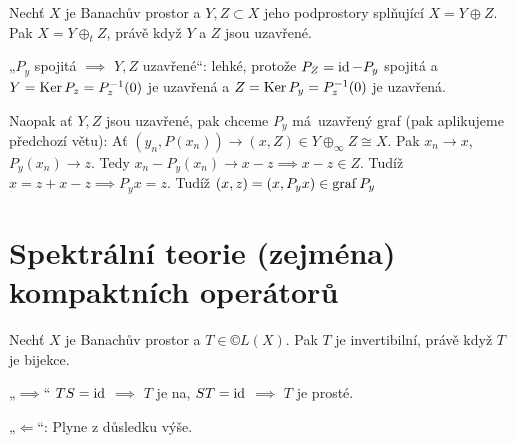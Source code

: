 \documentclass[12pt]{article}					%
\begin{document}
\begin{veta}
	Nechť $X$ je Banachův prostor a $Y, Z \subset X$ jeho podprostory splňující $X = Y \oplus Z$. Pak $X = Y\oplus_t Z$, právě když $Y$ a $Z$ jsou uzavřené.

	\begin{dukazin}
		„$P_y$ spojitá $\implies$ $Y, Z$ uzavřené“: lehké, protože $P_Z = \operatorname{id} - P_y$ spojitá a $Y = \operatorname{Ker} P_z = P_z^{-1}(0)$ je uzavřená a $Z = \operatorname{Ker} P_y = P_z^{-1}(0)$ je uzavřená.

		Naopak ať $Y, Z$ jsou uzavřené, pak chceme $P_y$ má uzavřený graf (pak aplikujeme předchozí větu): Ať $(y_n, P(x_n)) \rightarrow (x, Z) \in Y \oplus_∞ Z \cong X$. Pak $x_n \rightarrow x$, $P_y(x_n) \rightarrow z$. Tedy $x_n - P_y(x_n) \rightarrow x - z \implies x - z \in Z$. Tudíž $x = z + x - z \implies P_y x = z$. Tudíž $(x, z) = (x, P_yx) \in \operatorname{graf} P_y$
	\end{dukazin}
\end{veta}

\section{Spektrální teorie (zejména) kompaktních operátorů}
\begin{tvrzeni}
	Nechť $X$ je Banachův prostor a $T \in ©L(X)$. Pak $T$ je invertibilní, právě když $T$ je bijekce.

	\begin{dukazin}
		„$\implies$“ $TS = \operatorname{id}$ $\implies$ $T$ je na, $ST = \operatorname{id}$ $\implies$ $T$ je prosté.

		„$\Leftarrow$“: Plyne z důsledku výše.
	\end{dukazin}
\end{tvrzeni}
\end{document}
